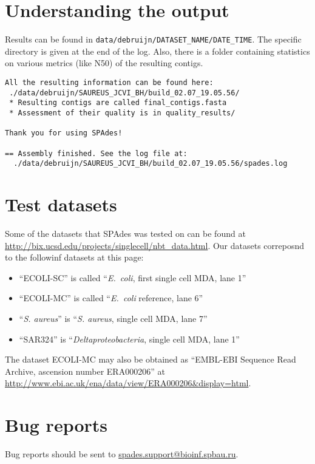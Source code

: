 \documentclass{article}
\def\spades{SPAdes}
\def\ecoli{\it E.~coli}
\begin{document}
\section{Understanding the output}
Results can be found in {\tt data/debruijn/DATASET\_NAME/DATE\_TIME}.
The specific directory is given at the end of the log.
Also, there is a folder containing statistics on various metrics (like N50) of the resulting contigs.
\begin{lstlisting}
All the resulting information can be found here: 
 ./data/debruijn/SAUREUS_JCVI_BH/build_02.07_19.05.56/
 * Resulting contigs are called final_contigs.fasta
 * Assessment of their quality is in quality_results/

Thank you for using SPAdes!

== Assembly finished. See the log file at: 
  ./data/debruijn/SAUREUS_JCVI_BH/build_02.07_19.05.56/spades.log
\end{lstlisting}


\section{Test datasets}\label{sec:testdatasets}
Some of the datasets that {\spades} was tested on can be found at
\url{http://bix.ucsd.edu/projects/singlecell/nbt_data.html}.
Our datasets correposnd to the followinf datasets at this page:
\begin{itemize}
\item ``ECOLI-SC'' is called ``{\ecoli}, first single cell MDA, lane 1''
\item ``ECOLI-MC'' is called ``{\ecoli} reference, lane 6''
\item ``{\it S. aureus}'' is ``{\it S. aureus}, single cell MDA, lane 7''
\item ``SAR324'' is ``{\it Deltaproteobacteria}, single cell MDA, lane 1''
\end{itemize}
The dataset ECOLI-MC may also be obtained as
``EMBL-EBI Sequence Read Archive, ascension number ERA000206''
at \url{http://www.ebi.ac.uk/ena/data/view/ERA000206&display=html}.

\section{Bug reports}
Bug reports should be sent to \url{spades.support@bioinf.spbau.ru}.






\end{document}
